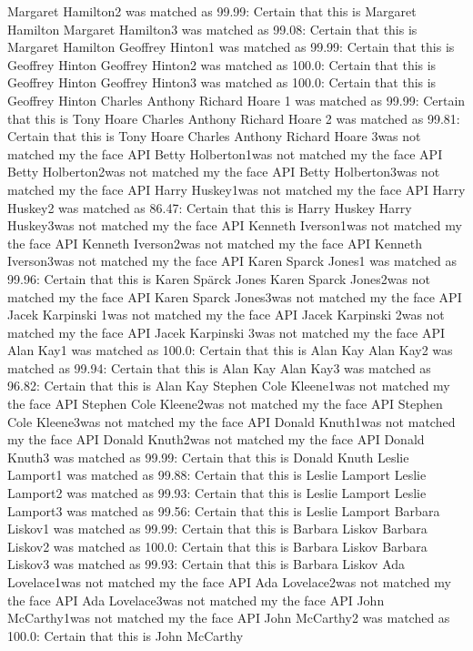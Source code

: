 \documentclass[12pt,a4paper]{article}
\begin{document}
\begin{appendices}
Margaret Hamilton2 was matched as 99.99: Certain that this is Margaret Hamilton
Margaret Hamilton3 was matched as 99.08: Certain that this is Margaret Hamilton
Geoffrey Hinton1 was matched as 99.99: Certain that this is Geoffrey Hinton
Geoffrey Hinton2 was matched as 100.0: Certain that this is Geoffrey Hinton
Geoffrey Hinton3 was matched as 100.0: Certain that this is Geoffrey Hinton
Charles Anthony Richard Hoare 1 was matched as 99.99: Certain that this is Tony Hoare
Charles Anthony Richard Hoare 2 was matched as 99.81: Certain that this is Tony Hoare
Charles Anthony Richard Hoare 3was not matched my the face API
Betty Holberton1was not matched my the face API
Betty Holberton2was not matched my the face API
Betty Holberton3was not matched my the face API
Harry Huskey1was not matched my the face API
Harry Huskey2 was matched as 86.47: Certain that this is Harry Huskey
Harry Huskey3was not matched my the face API
Kenneth Iverson1was not matched my the face API
Kenneth Iverson2was not matched my the face API
Kenneth Iverson3was not matched my the face API
Karen Sparck Jones1 was matched as 99.96: Certain that this is Karen Spärck Jones
Karen Sparck Jones2was not matched my the face API
Karen Sparck Jones3was not matched my the face API
Jacek Karpinski 1was not matched my the face API
Jacek Karpinski 2was not matched my the face API
Jacek Karpinski 3was not matched my the face API
Alan Kay1 was matched as 100.0: Certain that this is Alan Kay
Alan Kay2 was matched as 99.94: Certain that this is Alan Kay
Alan Kay3 was matched as 96.82: Certain that this is Alan Kay
Stephen Cole Kleene1was not matched my the face API
Stephen Cole Kleene2was not matched my the face API
Stephen Cole Kleene3was not matched my the face API
Donald Knuth1was not matched my the face API
Donald Knuth2was not matched my the face API
Donald Knuth3 was matched as 99.99: Certain that this is Donald Knuth
Leslie Lamport1 was matched as 99.88: Certain that this is Leslie Lamport
Leslie Lamport2 was matched as 99.93: Certain that this is Leslie Lamport
Leslie Lamport3 was matched as 99.56: Certain that this is Leslie Lamport
Barbara Liskov1 was matched as 99.99: Certain that this is Barbara Liskov
Barbara Liskov2 was matched as 100.0: Certain that this is Barbara Liskov
Barbara Liskov3 was matched as 99.93: Certain that this is Barbara Liskov
Ada Lovelace1was not matched my the face API
Ada Lovelace2was not matched my the face API
Ada Lovelace3was not matched my the face API
John McCarthy1was not matched my the face API
John McCarthy2 was matched as 100.0: Certain that this is John McCarthy

\end{appendices}
\end{document}
